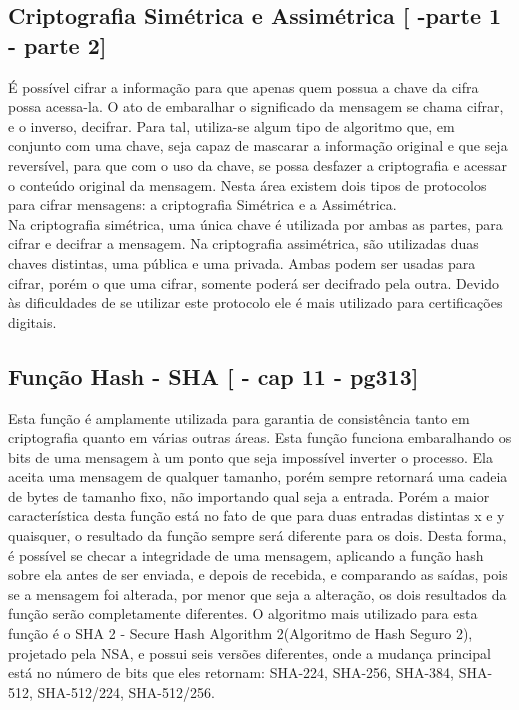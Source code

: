 \documentclass{article}
\begin{document}
		\subsection{Criptografia Simétrica e Assimétrica [\cite{STALLINS} -parte 1 - parte 2]}
			\begin{justify}
			

	 			\hspace{2cm} É possível cifrar a informação para que apenas quem possua a chave da cifra possa acessa-la. O ato de embaralhar o significado da mensagem se chama cifrar, e o inverso, decifrar. Para tal, utiliza-se algum tipo de algoritmo que, em conjunto com uma chave, seja capaz de mascarar a informação original e que seja reversível, para que com o uso da chave, se possa desfazer a criptografia e acessar o conteúdo original da mensagem. Nesta área existem dois tipos de protocolos para cifrar mensagens: a criptografia Simétrica e a Assimétrica. \\
				\hspace*{2cm}Na criptografia simétrica, uma única chave é utilizada por ambas as partes, para cifrar e decifrar a mensagem. Na criptografia assimétrica, são utilizadas duas chaves distintas, uma pública e uma privada. Ambas podem ser usadas para cifrar, porém o que uma cifrar, somente poderá ser decifrado pela outra. Devido às dificuldades de se utilizar este protocolo ele é mais utilizado para certificações digitais.
					
			\end{justify}

		\subsection{Função Hash - SHA [\cite{STALLINS} - cap 11 - pg313]}
			\begin{justify}
			

				\hspace{2cm} Esta função é amplamente utilizada para garantia de consistência tanto em criptografia quanto em várias outras áreas. Esta função funciona embaralhando os bits de uma mensagem à um ponto que seja impossível inverter o processo. Ela aceita uma mensagem de qualquer tamanho, porém sempre retornará uma cadeia de bytes de tamanho fixo, não importando qual seja a entrada. Porém a maior característica desta função está no fato de que para duas entradas distintas x e y quaisquer, o resultado da função sempre será diferente para os dois. Desta forma, é possível se checar a integridade de uma mensagem, aplicando a função hash sobre ela antes de ser enviada, e depois de recebida, e comparando as saídas, pois se a mensagem foi alterada, por menor que seja a alteração, os dois resultados da função serão completamente diferentes. O algoritmo mais utilizado para esta função é o SHA 2 - Secure Hash Algorithm 2(Algoritmo de Hash Seguro 2), projetado pela NSA, e possui seis versões diferentes, onde a mudança principal está no número de bits que eles retornam: SHA-224, SHA-256, SHA-384, SHA-512, SHA-512/224, SHA-512/256. 
			
			\end{justify}
\end{document}
